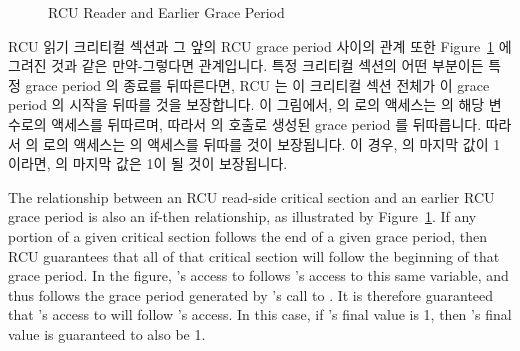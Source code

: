 \begin{figure}[tbp]
\centering
{}
\caption{RCU Reader and Earlier Grace Period}
\label{fig:defer:RCU Reader and Earlier Grace Period}
\end{figure}

RCU 읽기 크리티컬 섹션과 그 앞의 RCU grace period 사이의 관계 또한
Figure~\ref{fig:defer:RCU Reader and Earlier Grace Period} 에 그려진 것과 같은
만약-그렇다면 관계입니다.
특정 크리티컬 섹션의 어떤 부분이든 특정 grace period 의 종료를 뒤따른다면, RCU
는 이 크리티컬 섹션 전체가 이 grace period 의 시작을 뒤따를 것을 보장합니다.
이 그림에서,  의  로의 액세스는  의 해당 변수로의
액세스를 뒤따르며, 따라서  의  호출로 생성된
grace period 를 뒤따릅니다.
따라서  의  로의 액세스는  의 액세스를 뒤따를 것이
보장됩니다.
이 경우,  의 마지막 값이 1이라면,  의 마지막 값은 1이 될 것이
보장됩니다.

\iffalse

The relationship between an RCU read-side critical section and an earlier
RCU grace period is also an if-then relationship, as illustrated by
Figure~\ref{fig:defer:RCU Reader and Earlier Grace Period}.
If any portion of a given critical section follows the end of
a given grace period, then RCU guarantees that all of that critical
section will follow the beginning of that grace period.
In the figure, 's access to  follows 's access
to this same variable, and thus follows the grace period generated by
's call to .
It is therefore guaranteed that 's access to  will follow
's access.  In this case, if 's final value is 1, then
's final value is guaranteed to also be 1.

